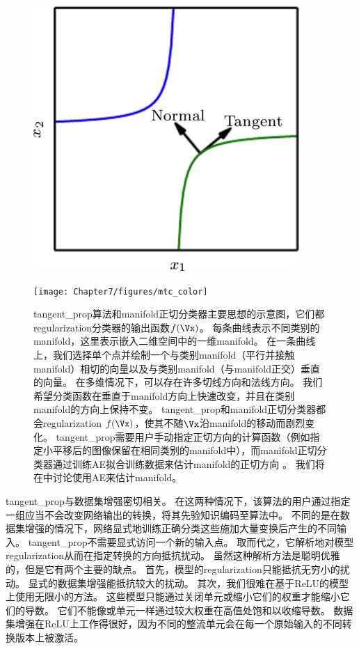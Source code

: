 \begin{figure}[!htb]
\ifOpenSource
\centerline{\includegraphics[scale=0.5]{images/62.png}}
\else
\centerline{\texttt{[image: Chapter7/figures/mtc\_color]}}
\fi
\caption{\gls{tangent_prop}算法\citep{Simard-et-al-1992}和\gls{manifold}正切分类器主要思想的示意图\citep{Rifai-et-al-2011c}，它们都\gls{regularization}分类器的输出函数$f(\Vx)$。
每条曲线表示不同类别的\gls{manifold}，这里表示嵌入二维空间中的一维\gls{manifold}。
在一条曲线上，我们选择单个点并绘制一个与类别\gls{manifold}（平行并接触\gls{manifold}）相切的向量以及与类别\gls{manifold}（与\gls{manifold}正交）垂直的向量。
在多维情况下，可以存在许多切线方向和法线方向。
我们希望分类函数在垂直于\gls{manifold}方向上快速改变，并且在类别\gls{manifold}的方向上保持不变。
\gls{tangent_prop}和\gls{manifold}正切分类器都会\gls{regularization} $f(\Vx)$，使其不随$\Vx$沿\gls{manifold}的移动而剧烈变化。
\gls{tangent_prop}需要用户手动指定正切方向的计算函数（例如指定小平移后的图像保留在相同类别的\gls{manifold}中），而\gls{manifold}正切分类器通过训练\gls{AE}拟合训练数据来估计\gls{manifold}的正切方向 。
我们将在中讨论使用\gls{AE}来估计\gls{manifold}。
}
\label{fig:chap7_mtc_color}
\end{figure}

\gls{tangent_prop}与数据集增强密切相关。
在这两种情况下，该算法的用户通过指定一组应当不会改变网络输出的转换，将其先验知识编码至算法中。
不同的是在数据集增强的情况下，网络显式地训练正确分类这些施加大量变换后产生的不同输入。
\gls{tangent_prop}不需要显式访问一个新的输入点。
取而代之，它解析地对模型\gls{regularization}从而在指定转换的方向抵抗扰动。
虽然这种解析方法是聪明优雅的，但是它有两个主要的缺点。
首先，模型的\gls{regularization}只能抵抗无穷小的扰动。
显式的数据集增强能抵抗较大的扰动。
其次，我们很难在基于\gls{ReLU}的模型上使用无限小的方法。
这些模型只能通过关闭单元或缩小它们的权重才能缩小它们的导数。
它们不能像或单元一样通过较大权重在高值处饱和以收缩导数。
数据集增强在\gls{ReLU}上工作得很好，因为不同的整流单元会在每一个原始输入的不同转换版本上被激活。

